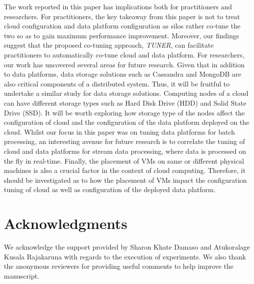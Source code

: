 \documentclass[3p]{elsarticle}
\begin{document}
The work reported in this paper has implications both for practitioners and researchers. For practitioners, the key takeaway from this paper is not to treat cloud configuration and data platform configuration as silos rather co-tune the two so as to gain maximum performance improvement. Moreover, our findings suggest that the proposed co-tuning approach, \textit{TUNER}, can facilitate practitioners to automatically co-tune cloud and data platform. For researchers, our work has uncovered several areas for future research. Given that in addition to data platforms, data storage solutions such as Cassandra and MongoDB are also critical components of a distributed system. Thus, it will be fruitful to undertake a similar study for data storage solutions. Computing nodes of a cloud can have different storage types such as Hard Disk Drive (HDD) and Solid State Drive (SSD). It will be worth exploring how storage type of the nodes affect the configuration of cloud and the configuration of the data platform deployed on the cloud. Whilst our focus in this paper was on tuning data platforms for batch processing, an interesting avenue for future research is to correlate the tuning of cloud and data platforms for stream data processing, where data is processed on the fly in real-time. Finally, the placement of VMs on same or different physical machines is also a crucial factor in the context of cloud computing. Therefore, it should be investigated as to how the placement of VMs impact the configuration tuning of cloud as well as configuration of the deployed data platform. 


\section*{Acknowledgments}
We acknowledge the support provided by Sharon Khate Damaso and Atukoralage Kusala Rajakaruna with regards to the execution of experiments. We also thank the anonymous reviewers for providing useful comments to help improve the manuscript.


%

\end{document}
